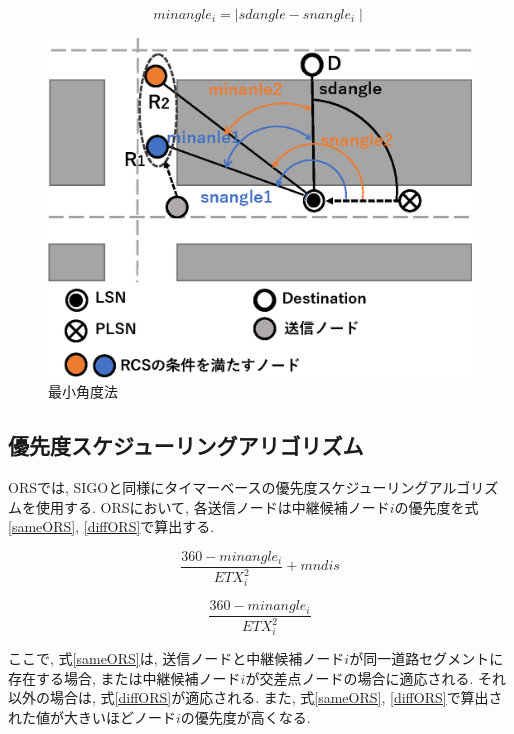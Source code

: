 \documentclass[10pt]{jreport}
\begin{document}
\begin{equation}
	\label{minangle}
	minangle_i = \mid sdangle - snangle_i \mid
\end{equation}

\begin{figure}[!ht]
	\centering
	\includegraphics[width=130mm]{figures/minangle.eps}
	\caption{最小角度法}
	\label{fig:minangle}
\end{figure}


\subsection{優先度スケジューリングアリゴリズム}
\label{ORS_priority}

ORSでは, SIGOと同様にタイマーベースの優先度スケジューリングアルゴリズムを使用する. ORSにおいて, 各送信ノードは中継候補ノード$i$の優先度を式\ref{sameORS}, \ref{diffORS}で算出する. 

\begin{equation}
	\label{sameORS}
	\frac{360 - minangle_i}{ETX_{i}^{2}} + mndis
\end{equation}

\begin{equation}
	\label{diffORS}
	\frac{360 - minangle_i}{ETX_{i}^{2}} 
\end{equation}

ここで, 式\ref{sameORS}は, 送信ノードと中継候補ノード$i$が同一道路セグメントに存在する場合, または中継候補ノード$i$が交差点ノードの場合に適応される. それ以外の場合は, 式\ref{diffORS}が適応される.
また, 式\ref{sameORS}, \ref{diffORS}で算出された値が大きいほどノード$i$の優先度が高くなる.
\end{document}
